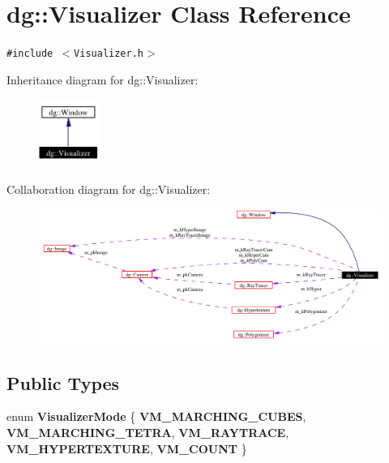 \section{dg::Visualizer Class Reference}
\label{classdg_1_1Visualizer}
{\tt \#include $<$Visualizer.h$>$}

Inheritance diagram for dg::Visualizer:\begin{figure}[H]
\begin{center}
\leavevmode
\includegraphics[width=55pt]{classdg_1_1Visualizer__inherit__graph}
\end{center}
\end{figure}
Collaboration diagram for dg::Visualizer:\begin{figure}[H]
\begin{center}
\leavevmode
\includegraphics[width=372pt]{classdg_1_1Visualizer__coll__graph}
\end{center}
\end{figure}
\subsection*{Public Types}
\begin{CompactItemize}
\item 
enum {\bf Visualizer\-Mode} \{ {\bf VM\_\-MARCHING\_\-CUBES}, 
{\bf VM\_\-MARCHING\_\-TETRA}, 
{\bf VM\_\-RAYTRACE}, 
{\bf VM\_\-HYPERTEXTURE}, 
{\bf VM\_\-COUNT}
 \}
\end{CompactItemize}

